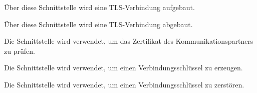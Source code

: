 





Über diese Schnittstelle wird eine TLS-Verbindung aufgebaut.


Über diese Schnittstelle wird eine TLS-Verbindung abgebaut.


Die Schnittstelle  wird verwendet, um das
Zertifikat des Kommunikationspartners zu prüfen.


Die Schnittstelle  wird
verwendet, um einen Verbindungsschlüssel zu erzeugen.


Die Schnittstelle  wird
verwendet, um einen Verbindungsschlüssel zu zerstören.



